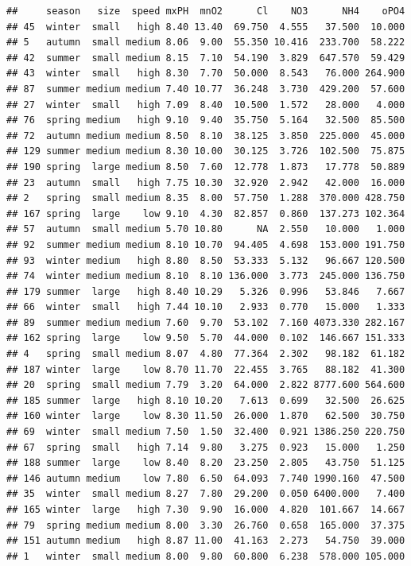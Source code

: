 \documentclass[]{report}
\begin{document}
\begin{verbatim}
##     season   size  speed mxPH  mnO2      Cl    NO3      NH4    oPO4
## 45  winter  small   high 8.40 13.40  69.750  4.555   37.500  10.000
## 5   autumn  small medium 8.06  9.00  55.350 10.416  233.700  58.222
## 42  summer  small medium 8.15  7.10  54.190  3.829  647.570  59.429
## 43  winter  small   high 8.30  7.70  50.000  8.543   76.000 264.900
## 87  summer medium medium 7.40 10.77  36.248  3.730  429.200  57.600
## 27  winter  small   high 7.09  8.40  10.500  1.572   28.000   4.000
## 76  spring medium   high 9.10  9.40  35.750  5.164   32.500  85.500
## 72  autumn medium medium 8.50  8.10  38.125  3.850  225.000  45.000
## 129 summer medium medium 8.30 10.00  30.125  3.726  102.500  75.875
## 190 spring  large medium 8.50  7.60  12.778  1.873   17.778  50.889
## 23  autumn  small   high 7.75 10.30  32.920  2.942   42.000  16.000
## 2   spring  small medium 8.35  8.00  57.750  1.288  370.000 428.750
## 167 spring  large    low 9.10  4.30  82.857  0.860  137.273 102.364
## 57  autumn  small medium 5.70 10.80      NA  2.550   10.000   1.000
## 92  summer medium medium 8.10 10.70  94.405  4.698  153.000 191.750
## 93  winter medium   high 8.80  8.50  53.333  5.132   96.667 120.500
## 74  winter medium medium 8.10  8.10 136.000  3.773  245.000 136.750
## 179 summer  large   high 8.40 10.29   5.326  0.996   53.846   7.667
## 66  winter  small   high 7.44 10.10   2.933  0.770   15.000   1.333
## 89  summer medium medium 7.60  9.70  53.102  7.160 4073.330 282.167
## 162 spring  large    low 9.50  5.70  44.000  0.102  146.667 151.333
## 4   spring  small medium 8.07  4.80  77.364  2.302   98.182  61.182
## 187 winter  large    low 8.70 11.70  22.455  3.765   88.182  41.300
## 20  spring  small medium 7.79  3.20  64.000  2.822 8777.600 564.600
## 185 summer  large   high 8.10 10.20   7.613  0.699   32.500  26.625
## 160 winter  large    low 8.30 11.50  26.000  1.870   62.500  30.750
## 69  winter  small medium 7.50  1.50  32.400  0.921 1386.250 220.750
## 67  spring  small   high 7.14  9.80   3.275  0.923   15.000   1.250
## 188 summer  large    low 8.40  8.20  23.250  2.805   43.750  51.125
## 146 autumn medium    low 7.80  6.50  64.093  7.740 1990.160  47.500
## 35  winter  small medium 8.27  7.80  29.200  0.050 6400.000   7.400
## 165 winter  large   high 7.30  9.90  16.000  4.820  101.667  14.667
## 79  spring medium medium 8.00  3.30  26.760  0.658  165.000  37.375
## 151 autumn medium   high 8.87 11.00  41.163  2.273   54.750  39.000
## 1   winter  small medium 8.00  9.80  60.800  6.238  578.000 105.000

\end{verbatim}
\end{document}
